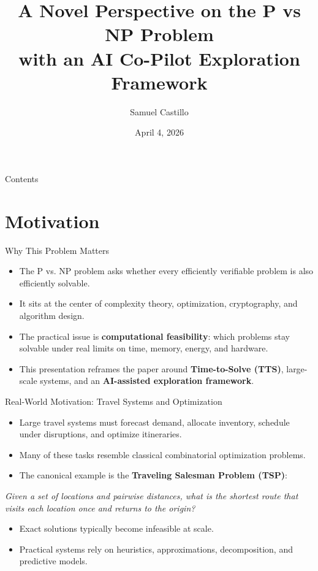 \documentclass[aspectratio=43]{beamer}
\title[P vs NP]{A Novel Perspective on the P vs NP Problem\\with an AI Co-Pilot Exploration Framework}
\author[Samuel Castillo]{Samuel Castillo}
\institute[UMass Amherst]{University of Massachusetts Amherst}
\date{April 4, 2026}
\begin{document}
\begin{frame}[plain]
\titlepage
\end{frame}

\begin{frame}{Contents}
\tableofcontents
\end{frame}

\section{Motivation}

\begin{frame}{Why This Problem Matters}
\begin{itemize}
    \item The P vs\@. NP problem asks whether every efficiently verifiable problem is also efficiently solvable.
    \item It sits at the center of complexity theory, optimization, cryptography, and algorithm design.
    \item The practical issue is \textbf{computational feasibility}: which problems stay solvable under real limits on time, memory, energy, and hardware.
    \item This presentation reframes the paper around \textbf{Time-to-Solve (TTS)}, large-scale systems, and an \textbf{AI-assisted exploration framework}.
\end{itemize}
\end{frame}

\begin{frame}{Real-World Motivation: Travel Systems and Optimization}
\begin{itemize}
    \item Large travel systems must forecast demand, allocate inventory, schedule under disruptions, and optimize itineraries.
    \item Many of these tasks resemble classical combinatorial optimization problems.
    \item The canonical example is the \textbf{Traveling Salesman Problem (TSP)}:
\end{itemize}

\medskip
\centering
\emph{Given a set of locations and pairwise distances, what is the shortest route that visits each location once and returns to the origin?}

\medskip
\raggedright
\begin{itemize}
    \item Exact solutions typically become infeasible at scale.
    \item Practical systems rely on heuristics, approximations, decomposition, and predictive models.
\end{itemize}
\end{frame}
\end{document}
